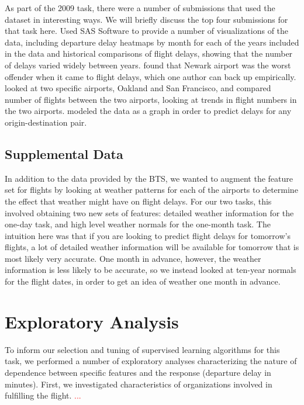 \documentclass{article}
\begin{document}
As part of the 2009 task, there were a number of submissions that used the dataset in interesting ways. We will briefly discuss the top four submissions for that task here. \cite{wicklin2009congestion} Used SAS Software to provide a number of visualizations of the data, including departure delay heatmaps by month for each of the years included in the data and historical comparisons of flight delays, showing that the number of delays varied widely between years. \cite{hofmann2011delayed} found that Newark airport was the worst offender when it came to flight delays, which one author can back up empirically. \cite{wickham2011tale} looked at two specific airports, Oakland and San Francisco, and compared number of flights between the two airports, looking at trends in flight numbers in the two airports. \cite{dey2009minimizing} modeled the data as a graph in order to predict delays for any origin-destination pair.

\subsection{Supplemental Data}

In addition to the data provided by the BTS, we wanted to augment the feature set for flights by looking at weather patterns for each of the airports to determine the effect that weather might have on flight delays. For our two tasks, this involved obtaining two new sets of features: detailed weather information for the one-day task, and high level weather normals for the one-month task. The intuition here was that if you are looking to predict flight delays for tomorrow's flights, a lot of detailed weather information will be available for tomorrow that is most likely very accurate. One month in advance, however, the weather information is less likely to be accurate, so we instead looked at ten-year normals for the flight dates, in order to get an idea of weather one month in advance.


\section{Exploratory Analysis}

To inform our selection and tuning of supervised learning algorithms for this task, we performed a number of exploratory analyses characterizing the nature of dependence between specific features and the response (departure delay in minutes). First, we investigated characteristics of organizations involved in fulfilling the flight. \textcolor{red}{...}
\end{document}

